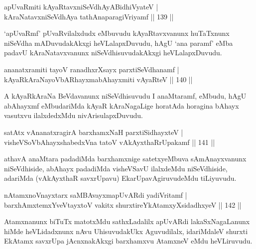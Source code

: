 \begin{shl}
apUvaRmiti kAyaRtavxniSeVdhAyABidhiVyateV |\\
kAraNatavxniSeVdhAya tathA\s naparagiVriyamf \hfill || 139 ||
\end{shl}

\begin{artha}
`apUvaRmf' pUvaRvilalxdudx eMbuvudu kAyaRtavxvanunx huTaTxnunx niSeVdha   mADuvudakAkxgi heVLalapxDuvudu, hAgU `ana paramf' eMba padavU   kAraNatavxvanunx niSeVdhisuvudakAkxgi heVLalapxDuvudu.
\end{artha}


\begin{shl}
ananatxramiti tayoV ranadhxrXsayx parxtiSeVdhanamf |\\
kAyaRkAraNayoVbARhayxmabAhayxmiti vAyaRteV \hfill || 140 ||
\end{shl}

\begin{artha}
A kAyaRkAraNa BeVdavanunx niSeVdhisuvudu I anaMtaramf, eMbudu, hAgU abAhayxmf eMbudariMda kAyaR kAraNagaLige horatAda horagina bAhayx vasutxvu ilalxdedxMdu nivArisulapxDuvudu.
\end{artha}


\begin{shl}
satAtx vA\s nanatxragirA barxhamxNaH parxtiSidhayxteV |\\
visheVSoV\s bAhayxshabedxVna tatoV vAkAyxthaRrUpakamf \hfill || 141 ||
\end{shl}

\begin{artha}
athavA anaMtara padadiMda barxhamxnige satetxyeMbuva sAmAnayxvanunx niSeVdhiside, abAhayx padadiMda visheVSavU ilalxdeMdu niSeVdhiside, adariMda (vAkAyxthaR savxrUpavu) EkarUpavAgiruvudeMdu tiLiyuvudu.
\end{artha}


		\begin{shl}
nA\s \s tamxnoV\s nayxtarx saMBAvayxmapUvARdi yadiVritamf |\\
barxhAmx\s \s temxYveVtayxtoV vakitx shurxtireYkAtamxyXsidadhxyeV \hfill || 142 ||
\end{shl}

\begin{artha}
Atamxnanunx biTuTx matotxMdu sathxLadalilx apUvARdi lakaSxNagaLanunx hiMde heVLidadxnunx nAvu UhisuvudakUkx Aguvudilalx, idariMdaleV shurxti EkAtamx savxrUpa jAcnxnakAkxgi barxhamxvu AtamxneV eMdu heVLiruvudu.
\end{artha}

